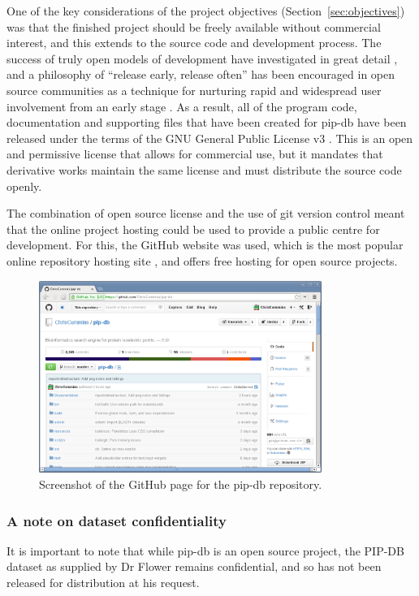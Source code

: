 One of the key considerations of the project objectives
(Section~\ref{sec:objectives}) was that the finished project should be
freely available without commercial interest, and this extends to the
source code and development process. The success of truly open models
of development have investigated in great detail
\cite{weber2004success, godfrey2000evolution, chesbrough2006open,
  von2005democratizing}, and a philosophy of ``release early, release
often'' has been encouraged in open source communities as a technique
for nurturing rapid and widespread user involvement from an early
stage \cite{raymond1999cathedral}. As a result, all of the program
code, documentation and supporting files that have been created for
pip-db have been released under the terms of the GNU General Public
License v3 \cite{gnu2007gpl}. This is an open and permissive license
that allows for commercial use, but it mandates that derivative works
maintain the same license and must distribute the source code openly.

The combination of open source license and the use of git version
control meant that the online project hosting could be used to provide
a public centre for development. For this, the GitHub website was
used, which is the most popular online repository hosting site
\cite{finley2011github}, and offers free hosting for open source
projects.

\begin{figure}[H]
\centering
    \includegraphics[width=0.82\textwidth]{assets/github}
\caption[GiHub project homepage]
        {Screenshot of the GitHub page for the pip-db repository.}
\label{fig:github-project}
\end{figure}

\subsubsection*{A note on dataset confidentiality}
It is important to note that while pip-db is an open source project,
the PIP-DB dataset as supplied by Dr Flower remains confidential,
and so has not been released for distribution at his request.

